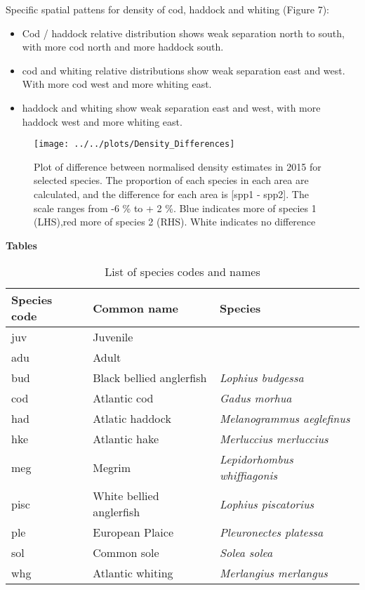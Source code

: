 \documentclass[11pt]{article}
\begin{document}
\newpage

Specific spatial pattens for density of cod, haddock and whiting (Figure 7):

\begin{itemize}
	\item Cod / haddock relative distribution shows weak separation north to
	south, with more cod north and more haddock south.
	\item cod and whiting relative distributions show weak separation east
		and west. With more cod west and more whiting east.
	\item haddock and whiting show weak separation east and west, with
		more haddock west and more whiting east.
\end{itemize}

\begin{figure}[!ht]
	\centering
	\texttt{[image: ../../plots/Density\_Differences]}
	\label{fig:DensityDiff}
	\caption{Plot of difference between normalised density estimates in
		2015 for selected species. The proportion of each species in
		each area are calculated, and the difference for each area is
		[spp1 - spp2]. The scale ranges from -6 \% to + 2 \%. Blue indicates
		more of species 1 (LHS),red more of species 2 (RHS).  White
		indicates no difference}
\end{figure}



\newpage

\textbf{Tables}

\begin{table}[!ht]
	\caption{List of species codes and names}
	\center
	\begin{tabular}{ p{3cm} p{4cm} p{5cm} }
		\hline
		Species code & Common name              & Species \\
		\hline
		juv          & Juvenile                 & \\
		adu          & Adult                    & \\
		\hline
		bud          & Black bellied anglerfish & \textit{Lophius budgessa} \\
		cod          & Atlantic cod             & \textit{Gadus morhua} \\
		had          & Atlatic haddock          & \textit{Melanogrammus aeglefinus} \\
		hke          & Atlantic hake            & \textit{Merluccius merluccius} \\
		meg          & Megrim                   & \textit{Lepidorhombus whiffiagonis} \\
		pisc         & White bellied anglerfish & \textit{Lophius piscatorius}	\\
		ple          & European Plaice          & \textit{Pleuronectes platessa} \\
		sol          & Common sole              & \textit{Solea solea} \\
		whg          & Atlantic whiting         & \textit{Merlangius merlangus} \\
		\hline
	\end{tabular}
\end{table}
\end{document}
